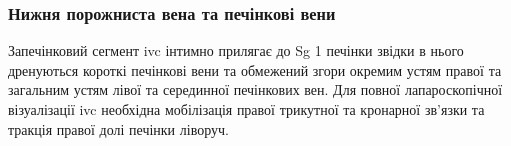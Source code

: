 \subsubsection{Нижня порожниста вена та печінкові вени}

Запечінковий сегмент \acrshort{ivc} інтимно прилягає до Sg 1 печінки звідки в нього дренуються короткі печінкові вени та обмежений згори окремим устям правої та загальним устям лівої та серединної печінкових вен. Для повної лапароскопічної візуалізації \acrshort{ivc} необхідна мобілізація правої трикутної та кронарної зв'язки та тракція правої долі печінки ліворуч.